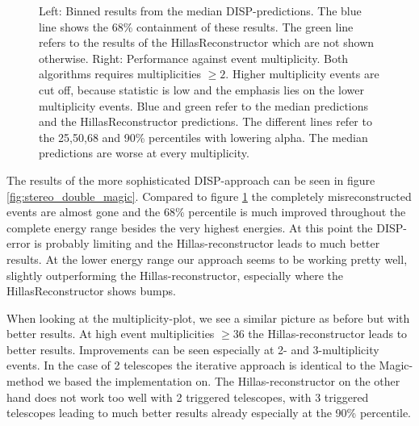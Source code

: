 \begin{figure}
{    Left: Binned results from the median DISP-predictions. The blue line shows the 
    68\% containment of these results. The green line refers to the 
    results of the HillasReconstructor which are not shown otherwise.
    Right: Performance against event multiplicity. Both algorithms requires 
    multiplicities $\geq 2$. Higher multiplicity events are cut off, because 
    statistic is low and the emphasis lies on the lower multiplicity events.
    Blue and green refer to the median predictions and the HillasReconstructor predictions.
    The different lines refer to the 25,50,68 and 90\% percentiles with 
    lowering alpha.
    The median predictions are worse at every multiplicity.}
    \label{fig:stereo_double_median}
\end{figure}

The results of the more sophisticated DISP-approach can be seen in figure \ref{fig:stereo_double_magic}.
Compared to figure \ref{fig:stereo_double_median} the completely misreconstructed events are almost
gone and the 68\% percentile is much improved throughout the complete energy range besides 
the very highest energies. At this point the DISP-error is probably limiting and the 
Hillas-reconstructor leads to much better results.
At the lower energy range our approach seems to be working pretty well, 
slightly outperforming the Hillas-reconstructor, especially 
where the HillasReconstructor shows bumps.

When looking at the multiplicity-plot, we see a similar picture as before but with 
better results. At high event multiplicities $\ge 36$ the Hillas-reconstructor 
leads to better results. Improvements can be seen especially at 2- and 3-multiplicity 
events. In the case of 2 telescopes the iterative approach is identical to the 
Magic-method we based the implementation on.
The Hillas-reconstructor on the other hand does not work too well with 2 
triggered telescopes, with 3 triggered telescopes leading to much better results 
already especially at the 90\% percentile.


